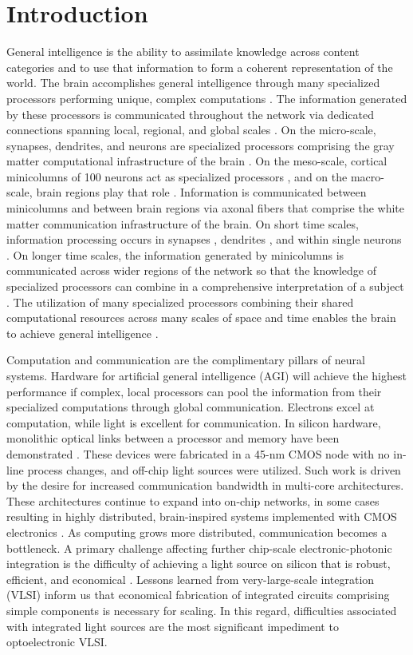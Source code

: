 \documentclass[twocolumn]{article}
\begin{document}
\section{\label{sec:introduction}Introduction}
General intelligence is the ability to assimilate knowledge across content categories and to use that information to form a coherent representation of the world. The brain accomplishes general intelligence through many specialized processors performing unique, complex computations \cite{ba1988,de2014}. The information generated by these processors is communicated throughout the network via dedicated connections spanning local, regional, and global scales \cite{sp2010}. On the micro-scale, synapses, dendrites, and neurons are specialized processors comprising the gray matter computational infrastructure of the brain \cite{geki2002}. On the meso-scale, cortical minicolumns of 100 neurons act as specialized processors \cite{mo1997}, and on the macro-scale, brain regions play that role \cite{brme2010}. Information is communicated between minicolumns and between brain regions via axonal fibers that comprise the white matter communication infrastructure of the brain. On short time scales, information processing occurs in synapses \cite{abre2004}, dendrites \cite{stsp2015}, and within single neurons \cite{ko1997}. On longer time scales, the information generated by minicolumns is communicated across wider regions of the network so that the knowledge of specialized processors can combine in a comprehensive interpretation of a subject \cite{bu2006}. The utilization of many specialized processors combining their shared computational resources across many scales of space and time enables the brain to achieve general intelligence \cite{ba1988,de2014}. 

Computation and communication are the complimentary pillars of neural systems. Hardware for artificial general intelligence (AGI) will achieve the highest performance if complex, local processors can pool the information from their specialized computations through global communication. Electrons excel at computation, while light is excellent for communication. In silicon hardware, monolithic optical links between a processor and memory have been demonstrated \cite{suwa2015}. These devices were fabricated in a 45-nm CMOS node with no in-line process changes, and off-chip light sources were utilized. Such work is driven by the desire for increased communication bandwidth in multi-core architectures. These architectures continue to expand into on-chip networks, in some cases resulting in highly distributed, brain-inspired systems implemented with CMOS electronics \cite{bo2000,pfgr2013,mear2014,fuga2014,payu2017,dasr2018}. As computing grows more distributed, communication becomes a bottleneck. A primary challenge affecting further chip-scale electronic-photonic integration is the difficulty of achieving a light source on silicon that is robust, efficient, and economical \cite{libo2010,zhyi2015}. Lessons learned from very-large-scale integration (VLSI) inform us that economical fabrication of integrated circuits comprising simple components is necessary for scaling. In this regard, difficulties associated with integrated light sources are the most significant impediment to optoelectronic VLSI.
\end{document}
